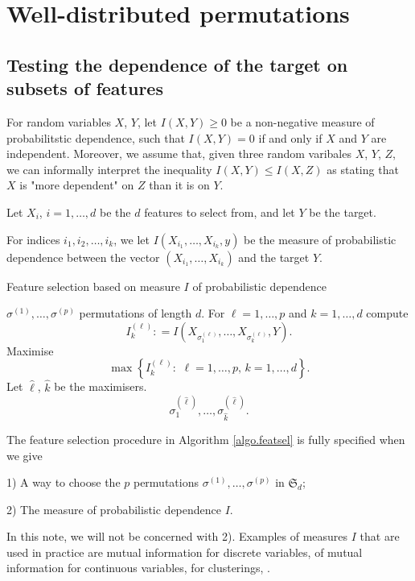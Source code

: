 \section{Well-distributed permutations}


\subsection{Testing the dependence of the target on subsets of features}

For random variables
$X$, $Y$,
let
$I(X, Y) \geq 0$
be a non-negative measure of probabilitstic dependence,
such that
$I(X, Y) = 0$
if and only if
$X$ and $Y$ are independent.
Moreover,
we assume that,
given three random varibales
$X$, $Y$, $Z$,
we can informally interpret the inequality
$I(X,Y) \leq I(X,Z)$
as stating that
$X$ is "more dependent" on $Z$ than it is on $Y$.

Let
$X_i$, $i=1, \dots, d$
be the $d$ features to select from,
and let $Y$ be the target.


For indices $i_1, i_2, \dots, i_k$, we let
$I(X_{i_1}, \dots, X_{i_k}, y)$
be the measure of probabilistic dependence
between
the vector
$(X_{i_1}, \dots, X_{i_k})$
and
the target $Y$.

\begin{algorithm}[h!]
\caption{Feature selection based on measure $I$ of probabilistic dependence}
\label{algo.featsel}
\begin{algorithmic}[1]
	\REQUIRE
$\sigma^{(1)}, \dots , \sigma^{(p)}$
permutations of length $d$.
\STATE
For
$\ell = 1, \dots, p$
and
$k = 1, \dots, d$
compute
$$
I^{(\ell)}_{k} : =
I(X_{\sigma^{(\ell)}_{1}}, \dots, X_{\sigma^{(\ell)}_{k}}, Y).
$$
\STATE
Maximise
$$
\max
\left\lbrace
I^{(\ell)}_{k} :
\,\,
\ell = 1, \dots, p,
\,
k = 1, \dots, d
\right\rbrace.
$$
\STATE
Let $\hat{\ell}$, $\hat{k}$ be the maximisers.
\RETURN
$$
\sigma^{(\hat{\ell})}_{1}, \dots, \sigma^{(\hat{\ell})}_{\hat{k}}.
$$
\end{algorithmic}
\end{algorithm}

The feature selection procedure in Algorithm \ref{algo.featsel} is fully specified when we give

1) A way to choose the $p$ permutations
$\sigma^{(1)}, \dots , \sigma^{(p)}$
in
$\mathfrak{S}_d$;

2) The measure of probabilistic dependence $I$.


In this note, 
we will not be concerned with 2). 
Examples of measures $I$ that are used in practice are
mutual information for discrete variables,
 of mutual information for continuous variables,
 for clusterings,
. 

